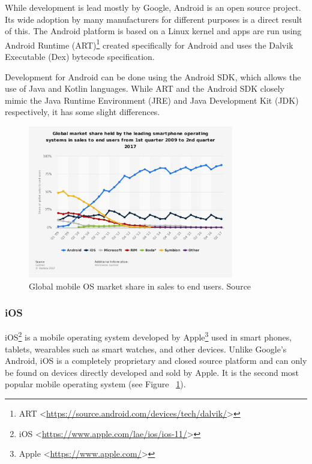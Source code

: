 While development is lead mostly by Google, Android is an open source project. Its wide adoption by many manufacturers for different purposes is a direct result of this. The Android platform is based on a Linux kernel and apps are run using Android Runtime (ART)\footnote{ART <\url{https://source.android.com/devices/tech/dalvik/}>} created specifically for Android and uses the Dalvik Executable (Dex) bytecode specification.

Development for Android can be done using the Android SDK, which allows the use of Java and Kotlin languages. While ART and the Android SDK closely mimic the Java Runtime Environment (JRE) and Java Development Kit (JDK) respectively, it has some slight differences.

\begin{figure}[!ht]
	\centering
	\includegraphics[width=0.8\textwidth]{figures/02_analysis/mobile-market}
    \caption{Global mobile OS market share in sales to end users. Source\cite{statista-mobile-share}}
    \label{fig:statista-mobile-market}
\end{figure}

\subsubsection{iOS}
iOS\footnote{iOS <\url{https://www.apple.com/lae/ios/ios-11/}>} is a mobile operating system developed by Apple\footnote{Apple <\url{https://www.apple.com/}>} used in smart phones, tablets, wearables such as smart watches, and other devices. Unlike Google's Android, iOS is a completely proprietary and closed source platform and can only be found on devices directly developed and sold by Apple. It is the second most popular mobile operating system (see Figure ~\ref{fig:statista-mobile-market}).

